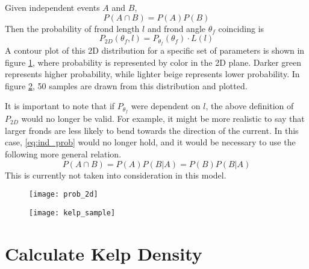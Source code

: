 Given independent events $A$ and $B$,
\begin{equation}
	\label{eq:ind_prob}
	P(A \cap B) = P(A)P(B)
\end{equation}
Then the probability of frond length $l$ and frond angle $\theta_f$ coinciding is 
\begin{equation}
	P_{2D}(\theta_f,l) = P_{\theta_f}(\theta_f) \cdot L(l)
\end{equation}
A contour plot of this 2D distribution for a specific set of parameters is shown in figure \ref{fig:dist_2d}, where probability is represented by color in the 2D plane.
Darker green represents higher probability, while lighter beige represents lower probability.
In figure \ref{fig:kelp_sample}, 50 samples are drawn from this distribution and plotted.

It is important to note that if $P_{\theta_f}$ were dependent on $l$, the above definition of $P_{2D}$ would no longer be valid.
For example, it might be more realistic to say that larger fronds are less likely to bend towards the direction of the current.
In this case, \eqref{eq:ind_prob} would no longer hold, and it would be necessary to use the following more general relation.
\begin{equation}
	P(A \cap B) = P(A)P(B|A) = P(B)P(B|A)
\end{equation}
This is currently not taken into consideration in this model.

\begin{figure}[h]
	\centering
	\texttt{[image: prob\_2d]}
	\vspace{-3em}
	\label{fig:dist_2d}
\end{figure}

\begin{figure}[h]
	\centering
	\texttt{[image: kelp\_sample]}
	\vspace{-2em}
	\label{fig:kelp_sample}
\end{figure}

\section{Calculate Kelp Density}
